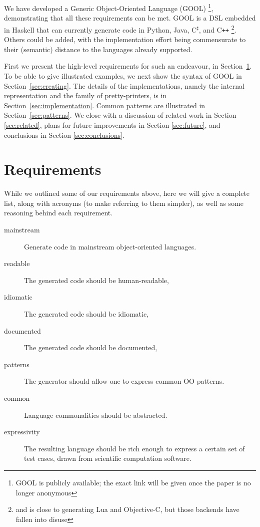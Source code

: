 \documentclass[sigplan,review,anonymous,prologue,dvipsnames]{acmart}
\newcommand{\Csharp}{C$^{\sharp}$}
\newcommand{\Cplusplus}{C\texttt{++}}
\begin{document}
We have developed a Generic Object-Oriented Language (GOOL)%
\footnote{GOOL is publicly available; the exact link will be
given once the paper is no longer anonymous}, demonstrating
that all these requirements can be met.  GOOL is a DSL embedded in Haskell that
can currently generate code in Python, Java, \Csharp, and \Cplusplus%
\footnote{and is close to generating Lua and Objective-C, but those backends
have fallen into disuse}. Others could be added, with the implementation
effort being commensurate to their (semantic) distance to the languages
already supported.

First we present the high-level requirements for such an endeavour, in
Section~\ref{sec:req}.  To be able to give illustrated examples, we
next show the syntax of GOOL in Section~\ref{sec:creating}. The details of
the implementations, namely the internal representation and the
family of pretty-printers, is in Section~\ref{sec:implementation}.
Common patterns are illustrated in Section~\ref{sec:patterns}.  We
close with a discussion of related work in Section \ref{sec:related}, plans for
future improvements in Section \ref{sec:future}, and conclusions in Section
\ref{sec:conclusions}.

\section{Requirements} \label{sec:req}

While we outlined some of our requirements above, here we will give a
complete list, along with acronyms (to make referring to them simpler),
as well as some reasoning behind each requirement.

\begin{description}
\item[mainstream] Generate code in mainstream object-oriented languages.
\item[readable] The generated code should be human-readable,
\item[idiomatic] The generated code should be idiomatic,
\item[documented] The generated code should be documented,
\item[patterns] The generator should allow one to express common OO patterns.
\item[common] Language commonalities should be abstracted.
\item[expressivity] The resulting language should be rich enough to express a
certain set of test cases, drawn from scientific computation software.
\end{description}
\end{document}

